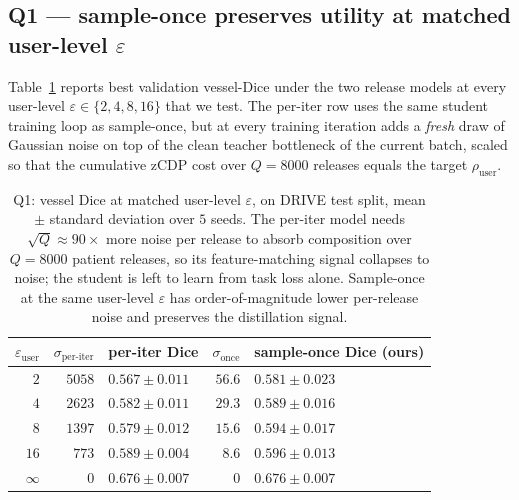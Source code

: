 \subsection{Q1 — sample-once preserves utility at matched user-level $\varepsilon$}
\label{ssec:q1-sample-once}

Table~\ref{tab:q1-sample-once} reports best validation vessel-Dice under
the two release models at every user-level $\varepsilon\!\in\!\{2,4,8,16\}$
that we test. The per-iter row uses the same student training loop as
sample-once, but at every training iteration adds a \emph{fresh} draw of
Gaussian noise on top of the clean teacher bottleneck of the current
batch, scaled so that the cumulative zCDP cost over $Q\!=\!8000$
releases equals the target $\rho_{\mathrm{user}}$.

\begin{table}[t]
\centering
\small
\caption{Q1: vessel Dice at matched user-level $\varepsilon$, on DRIVE
test split, mean $\pm$ standard deviation over $5$ seeds. The per-iter
model needs $\sqrt{Q}\!\approx\!90\!\times$ more noise per release to
absorb composition over $Q\!=\!8000$ patient releases, so its
feature-matching signal collapses to noise; the student is left to
learn from task loss alone. Sample-once at the same user-level
$\varepsilon$ has order-of-magnitude lower per-release noise and
preserves the distillation signal.}
\label{tab:q1-sample-once}
\begin{tabular}{r r l r l}
\toprule
$\varepsilon_{\mathrm{user}}$
   & $\sigma_{\text{per-iter}}$ & per-iter Dice
   & $\sigma_{\text{once}}$     & sample-once Dice (ours) \\
\midrule
$2$   & $5058$  & $0.567 \pm 0.011$  & $56.6$  & $\mathbf{0.581 \pm 0.023}$ \\
$4$   & $2623$  & $0.582 \pm 0.011$  & $29.3$  & $\mathbf{0.589 \pm 0.016}$ \\
$8$   & $1397$  & $0.579 \pm 0.012$  & $15.6$  & $\mathbf{0.594 \pm 0.017}$ \\
$16$  & $773$   & $0.589 \pm 0.004$  & $8.6$   & $\mathbf{0.596 \pm 0.013}$ \\
$\infty$ & $0$  & $0.676 \pm 0.007$  & $0$     & $0.676 \pm 0.007$ \\
\bottomrule
\end{tabular}
\end{table}

